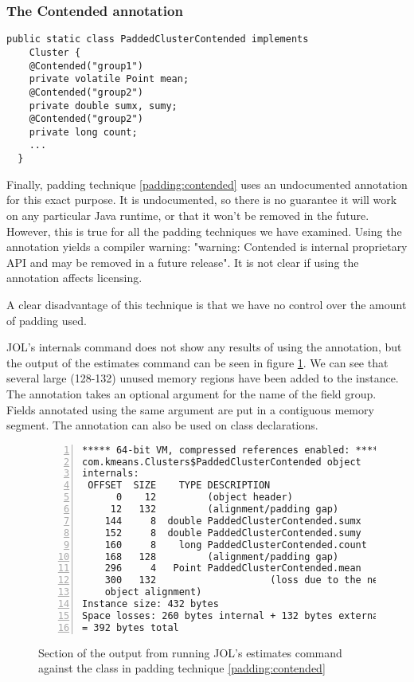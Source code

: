 \subsubsection{The Contended annotation}

\begin{padding}[h]
\begin{Verbatim}[frame=single]
  public static class PaddedClusterContended implements
    Cluster {
    @Contended("group1")
    private volatile Point mean;
    @Contended("group2")
    private double sumx, sumy;
    @Contended("group2")
    private long count;
    ...
  }
\end{Verbatim}
	\caption{}
	\label{padding:contended}
\end{padding}

Finally, padding technique \ref{padding:contended} uses an undocumented
annotation  for this exact purpose. It is undocumented,
so there is no guarantee it will work on any particular Java runtime, or that it
won't be removed in the future. However, this is true for all the padding
techniques we have examined. Using the  annotation yields a
compiler warning: "warning: Contended is internal proprietary API and may be
removed in a future release". It is not clear if using the annotation affects
licensing.

A clear disadvantage of this technique is that we have no control over the
amount of padding used.

JOL's internals command does not show any results of using the 
annotation, but the output of the estimates command can be seen in figure
\ref{jol:contended}. We can see that several large (128-132) unused memory
regions have been added to the instance. The annotation takes an optional
argument for the name of the field group. Fields annotated using the same
argument are put in a contiguous memory segment. The 
annotation can also be used on class declarations.

\begin{figure}[h]
\begin{Verbatim}[frame=single, numbers=left]
***** 64-bit VM, compressed references enabled: *****
com.kmeans.Clusters$PaddedClusterContended object
internals:
 OFFSET  SIZE    TYPE DESCRIPTION
      0    12         (object header)
     12   132         (alignment/padding gap)
    144     8  double PaddedClusterContended.sumx
    152     8  double PaddedClusterContended.sumy
    160     8    long PaddedClusterContended.count
    168   128         (alignment/padding gap)
    296     4   Point PaddedClusterContended.mean
    300   132                    (loss due to the next
    object alignment)
Instance size: 432 bytes
Space losses: 260 bytes internal + 132 bytes external
= 392 bytes total
\end{Verbatim}
	\caption{Section of the output from running JOL's estimates command
	against the
	 class in padding technique
	\ref{padding:contended}}
	\label{jol:contended}
\end{figure}
